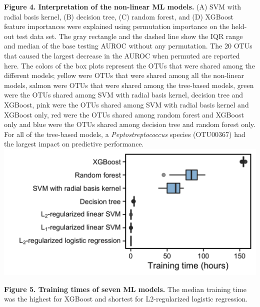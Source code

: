 \documentclass[11pt,]{article}
\begin{document}
\textbf{Figure 4. Interpretation of the non-linear ML models.} (A) SVM
with radial basis kernel, (B) decision tree, (C) random forest, and (D)
XGBoost feature importances were explained using permutation importance
on the held-out test data set. The gray rectangle and the dashed line
show the IQR range and median of the base testing AUROC without any
permutation. The 20 OTUs that caused the largest decrease in the AUROC
when permuted are reported here. The colors of the box plots represent
the OTUs that were shared among the different models; yellow were OTUs
that were shared among all the non-linear models, salmon were OTUs that
were shared among the tree-based models, green were the OTUs shared
among SVM with radial basis kernel, decision tree and XGBoost, pink were
the OTUs shared among SVM with radial basis kernel and XGBoost only, red
were the OTUs shared among random forest and XGBoost only and blue were
the OTUs shared among decision tree and random forest only. For all of
the tree-based models, a \emph{Peptostreptococcus} species (OTU00367)
had the largest impact on predictive performance. \newpage
\includegraphics{Figure_5.png}

\textbf{Figure 5. Training times of seven ML models.} The median
training time was the highest for XGBoost and shortest for
L2-regularized logistic regression. \newpage

\small
\end{document}
